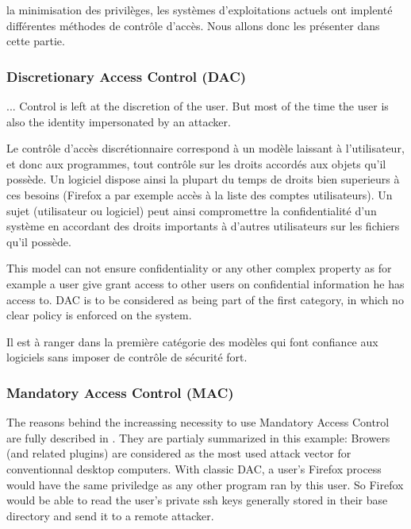 \documentclass[pdftex,a4paper,titlepage,11pt]{article}
\begin{document}
la minimisation des privilèges, les systèmes d'exploitations actuels ont
implenté différentes méthodes de contrôle d'accès. Nous allons donc les
présenter dans cette partie.

\subsubsection{Discretionary Access Control (DAC)}

... Control is left at the discretion of the user. But most of the time the user
is also the identity impersonated by an attacker.

Le contrôle d'accès discrétionnaire correspond à un modèle laissant à
l'utilisateur, et donc aux programmes, tout contrôle sur les droits accordés aux
objets qu'il possède. Un logiciel dispose ainsi la plupart du temps de droits
bien superieurs à ces besoins (Firefox a par exemple accès à la liste des
comptes utilisateurs). Un sujet (utilisateur ou logiciel) peut ainsi
compromettre la confidentialité d'un système en accordant des droits importants
à d'autres utilisateurs sur les fichiers qu'il possède.

\bigskip

This model can not ensure confidentiality or any other complex property as for
example a user give grant access to other users on confidential information he
has access to. DAC is to be considered as being part of the first category, in
which no clear policy is enforced on the system.

Il est à ranger dans la première catégorie des modèles qui font confiance aux
logiciels sans imposer de contrôle de sécurité fort.

\subsubsection{Mandatory Access Control (MAC)}

The reasons behind the increassing necessity to use Mandatory Access Control are
fully described in \cite{NSATIOF}. They are partialy summarized in this example:
Browers (and related plugins) are considered as the most used attack vector for
conventionnal desktop computers. With classic DAC, a user's Firefox process
would have the same priviledge as any other program ran by this user. So Firefox
would be able to read the user's private ssh keys generally stored in their base
directory and send it to a remote attacker.
\end{document}
